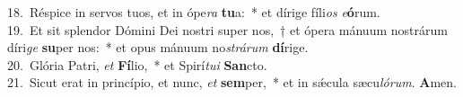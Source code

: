 {18.~}Réspice in servos tuos, et in ópe\textit{ra} \textbf{tu}a:~* et dírige fíli\textit{os} \textit{e}\textbf{ó}rum.\\
{19.~}Et sit splendor Dómini Dei nostri super nos,~† et ópera mánuum nostrárum díri\textit{ge} \textbf{su}per nos:~* et opus mánuum no\textit{strá}\textit{rum} \textbf{dí}rige.\\
{20.~}Glória Patri, \textit{et} \textbf{Fí}lio,~* et Spirí\textit{tu}\textit{i} \textbf{San}cto.\\
{21.~}Sicut erat in princípio, et nunc, \textit{et} \textbf{sem}per,~* et in sǽcula sæcu\textit{ló}\textit{rum}. \textbf{A}men.\\
